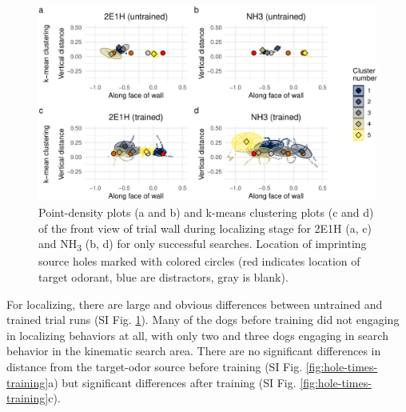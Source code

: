 \documentclass[
]{article}
\begin{document}
\begin{figure}
\centering
\includegraphics{supplementary-info_files/figure-latex/frontwall-detailing-training-1.pdf}
\caption{\label{fig:frontwall-detailing-training}Point-density plots (a and b) and k-means clustering plots (c and d) of the front view of trial wall during localizing stage for 2E1H (a, c) and NH\textsubscript{3} (b, d) for only successful searches. Location of imprinting source holes marked with colored circles (red indicates location of target odorant, blue are distractors, gray is blank).}
\end{figure}

For localizing, there are large and obvious differences between untrained and trained trial runs (SI Fig. \ref{fig:frontwall-detailing-training}). Many of the dogs before training did not engaging in localizing behaviors at all, with only two and three dogs engaging in search behavior in the kinematic search area. There are no significant differences in distance from the target-odor source before training (SI Fig. \ref{fig:hole-times-training}a) but significant differences after training (SI Fig. \ref{fig:hole-times-training}c).
\end{document}
